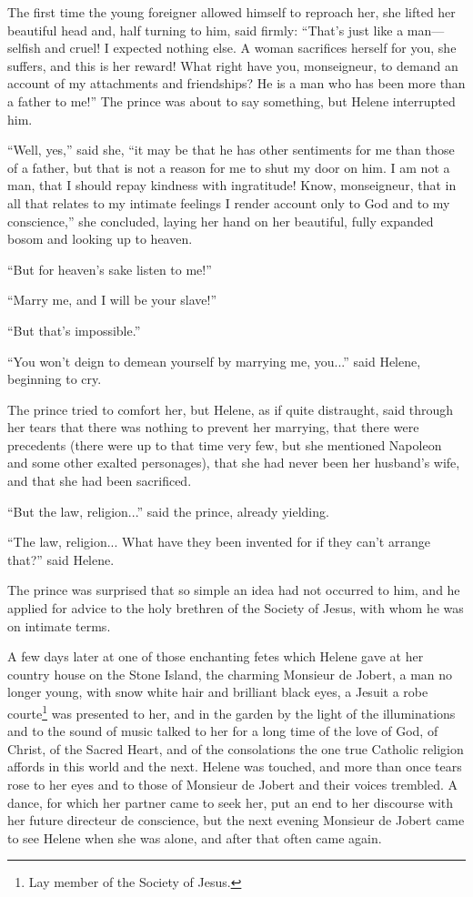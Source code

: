 The first time the young foreigner allowed himself to reproach
her, she lifted her beautiful head and, half turning to him, said
firmly: ``That's just like a man---selfish and cruel! I expected
nothing else. A woman sacrifices herself for you, she suffers,
and this is her reward! What right have you, monseigneur, to
demand an account of my attachments and friendships? He is a man
who has been more than a father to me!'' The prince was about to
say something, but Helene interrupted him.

``Well, yes,'' said she, ``it may be that he has other sentiments
for me than those of a father, but that is not a reason for me to
shut my door on him. I am not a man, that I should repay kindness
with ingratitude!  Know, monseigneur, that in all that relates to
my intimate feelings I render account only to God and to my
conscience,'' she concluded, laying her hand on her beautiful,
fully expanded bosom and looking up to heaven.

``But for heaven's sake listen to me!''

``Marry me, and I will be your slave!''

``But that's impossible.''

``You won't deign to demean yourself by marrying me, you...''
said Helene, beginning to cry.

The prince tried to comfort her, but Helene, as if quite
distraught, said through her tears that there was nothing to
prevent her marrying, that there were precedents (there were up
to that time very few, but she mentioned Napoleon and some other
exalted personages), that she had never been her husband's wife,
and that she had been sacrificed.

``But the law, religion...'' said the prince, already yielding.

``The law, religion... What have they been invented for if they
can't arrange that?'' said Helene.

The prince was surprised that so simple an idea had not occurred
to him, and he applied for advice to the holy brethren of the
Society of Jesus, with whom he was on intimate terms.

A few days later at one of those enchanting fetes which Helene
gave at her country house on the Stone Island, the charming
Monsieur de Jobert, a man no longer young, with snow white hair
and brilliant black eyes, a Jesuit a robe courte\footnote{Lay
member of the Society of Jesus.}  was presented to her, and in
the garden by the light of the illuminations and to the sound of
music talked to her for a long time of the love of God, of
Christ, of the Sacred Heart, and of the consolations the one true
Catholic religion affords in this world and the next. Helene was
touched, and more than once tears rose to her eyes and to those
of Monsieur de Jobert and their voices trembled. A dance, for
which her partner came to seek her, put an end to her discourse
with her future directeur de conscience, but the next evening
Monsieur de Jobert came to see Helene when she was alone, and
after that often came again.

